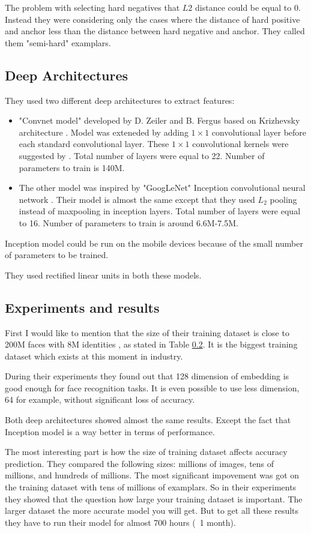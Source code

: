 \documentclass[paper=a4, fontsize=11pt]{scrartcl} %
\numberwithin{equation}{section} %
\numberwithin{figure}{section} %
\numberwithin{table}{section} %
\begin{document}
The problem with selecting hard negatives that $L2$ distance could be equal to 0. Instead they were considering only the cases where the distance of hard positive and anchor less than the distance between hard negative and anchor. They called  them "semi-hard" examplars. 

\subsection{Deep Architectures}

They used two different deep architectures to extract features: 
\begin{itemize}
  \item "Convnet model" developed by D. Zeiler and B. Fergus \cite{zeiler2014visualizing} based on Krizhevsky architecture \cite{krizhevsky2012imagenet}. Model was exteneded by adding $1\times1$ convolutional layer before each standard convolutional layer. These $1\times1$ convolutional kernels were suggested by \cite{min2013nin}. Total number of layers were equal to 22. Number of parameters to train is 140M.
  \item The other model was inspired by "GoogLeNet" Inception convolutional neural network \cite{szegedy2014going}. Their model is almost the same except that they used $L_2$ pooling instead of maxpooling in inception layers. Total number of layers were equal to 16. Number of parameters to train is around 6.6M-7.5M.
\end{itemize}
 
Inception model could be run on the mobile devices because of the small number of parameters to be trained. \par
They used rectified linear units in both these models.

\subsection{Experiments and results}
First I would like to mention that the size of their training dataset is close to 200M faces with 8M identities \cite{schroff2015facenet}, as stated in Table \ref{}. It is the biggest training dataset which exists at this moment in industry. \par
During their experiments they found out that 128 dimension of embedding is good enough for face recognition tasks. It is even possible to use less dimension, 64 for example, without significant loss of accuracy. \par
Both deep architectures showed almost the same results. Except the fact that Inception model is a way better in terms of performance. \par
The most interesting part is how the size of training dataset affects accuracy prediction. They compared the following sizes: millions of images, tens of millions, and hundreds of millions. The most significant impovement was got on the training dataset with tens of millions of examplars. So in their experiments they showed that the question how large your training dataset is important. The larger dataset the more accurate model you will get. But to get all these results they have to run their model for almost 700 hours (~1 month).  \par
\end{document}
